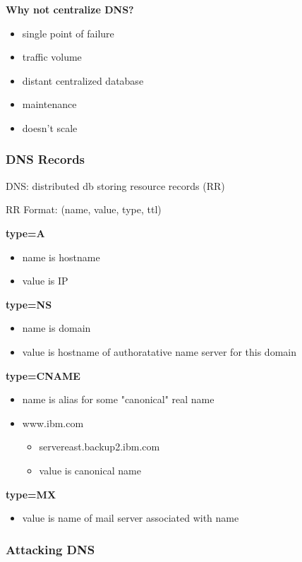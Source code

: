 \documentclass[11pt]{article}
\begin{document}
\textbf{Why not centralize DNS?}
\begin{itemize}
\item single point of failure
\item traffic volume
\item distant centralized database
\item maintenance
\item doesn't scale
\end{itemize}

\subsubsection{DNS Records}
\label{sec:org0dfb7f9}

DNS: distributed db storing resource records (RR) 

RR Format: (name, value, type, ttl)

\textbf{type=A}
\begin{itemize}
\item name is hostname
\item value is IP
\end{itemize}

\textbf{type=NS}
\begin{itemize}
\item name is domain
\item value is hostname of authoratative name server for this domain
\end{itemize}

\textbf{type=CNAME}
\begin{itemize}
\item name is alias for some "canonical" real name
\item www.ibm.com
\begin{itemize}
\item servereast.backup2.ibm.com
\item value is canonical name
\end{itemize}
\end{itemize}

\textbf{type=MX}
\begin{itemize}
\item value is name of mail server associated with name
\end{itemize}


\subsubsection{Attacking DNS}
\label{sec:org489174a}
\end{document}
